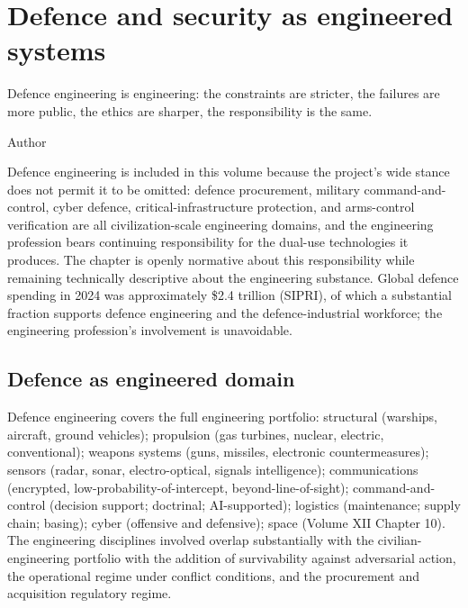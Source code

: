 \chapter{Defence and security as engineered systems}
\label{vol12:ch09}

\epigraph{Defence engineering is engineering: the constraints are stricter, the failures are more public, the ethics are sharper, the responsibility is the same.}{Author}


\noindent
Defence engineering is included in this volume because the project's wide stance does not permit it to be omitted: defence procurement, military command-and-control, cyber defence, critical-infrastructure protection, and arms-control verification are all civilization-scale engineering domains, and the engineering profession bears continuing responsibility for the dual-use technologies it produces. The chapter is openly normative about this responsibility while remaining technically descriptive about the engineering substance. Global defence spending in 2024 was approximately \$2.4 trillion (SIPRI), of which a substantial fraction supports defence engineering and the defence-industrial workforce; the engineering profession's involvement is unavoidable.

\section{Defence as engineered domain}

Defence engineering covers the full engineering portfolio: structural (warships, aircraft, ground vehicles); propulsion (gas turbines, nuclear, electric, conventional); weapons systems (guns, missiles, electronic countermeasures); sensors (radar, sonar, electro-optical, signals intelligence); communications (encrypted, low-probability-of-intercept, beyond-line-of-sight); command-and-control (decision support; doctrinal; AI-supported); logistics (maintenance; supply chain; basing); cyber (offensive and defensive); space (Volume XII Chapter 10). The engineering disciplines involved overlap substantially with the civilian-engineering portfolio with the addition of survivability against adversarial action, the operational regime under conflict conditions, and the procurement and acquisition regulatory regime.

